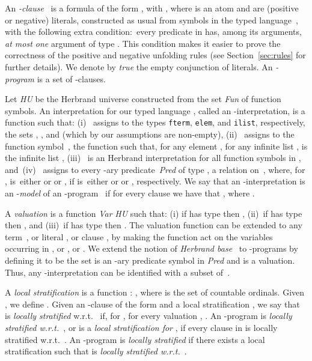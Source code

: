 \documentclass[english]{tlp}
\begin{document}
An {\mbox{{\em -clause} }} is a formula of the form
, with ,
where  is an atom and  are (positive or
negative) literals, constructed as usual from symbols in the typed
language~, with the following extra
condition:~every predicate in  has, among its
arguments, {\em at most one} argument of type . This
condition makes it easier to prove the correctness of the positive and
negative unfolding rules
(see Section~\ref{sec:rules} for further details).
We denote by {\it true} the empty conjunction of literals.
An {\em -program} is a set of
-clauses. 

Let \mbox{\it{HU}} be the Herbrand universe constructed from the set
{\it{Fun}} of
function symbols. 
An interpretation for our typed language
, called an
{\mbox{-in\-ter}}\-pretation, is a function  such that:
(i)~ assigns to the types \texttt{fterm}, \texttt{elem},
 and \texttt{ilist}, respectively,
the sets , , and 
(which by our assumptions are non-empty),
(ii)~ assigns to the function symbol~, the function  such that, for any
element , for any infinite list ,
 is the infinite list ,
(iii)~ is an Herbrand interpretation for all function symbols in
,
and~(iv)~ assigns to every -ary predicate \,{\it{Pred}}
of type \mbox{}, a relation
on~, where, for ,
 is~either  or  or , if
 is~either  or  or
, respectively. We say that an
-interpretation  is an {\mbox{-{\it model}}} of
an \mbox{-program } if for every clause 
we have that , where
.

A \emph{valuation} is a function  {\it{Var}} 
\mbox{\it{HU}}  such
that: (i) if  has type  then
, (ii)~if  has type 
then , and (iii)~if  has type 
then . The valuation function  can be
extended to any term~, or literal , or clause , by
making the function  act on the variables occurring in , or , or
.
We extend the notion of {\em Herbrand base}~\cite{Llo87} to
-programs by defining it to be the set  is an -ary predicate 
symbol in {\it Pred} and 
is a valuation. Thus, any -interpretation can be identified with a
subset of~.

A \emph{local stratification} is a function : , where  is the set of
countable ordinals. Given , we define
. Given an -clause  of the
form  
and a local stratification , we
say that  is \emph{locally stratified} w.r.t.~ if, for , for every valuation , \emph{}. An -program 
is \emph{locally stratified w.r.t.~}, or 
is a \emph{local stratification for} , if every clause in  is locally stratified w.r.t.~. An -program
 is \emph{locally stratified} if there exists a local
stratification  such that  is \emph{locally
stratified w.r.t.~}. 
\end{document}
